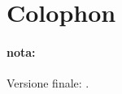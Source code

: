 
\pagestyle{empty}


\section*{Colophon}
\paragraph{nota:}
\lipsum[2]

\bigskip

\noindent Versione finale: \myTime.
